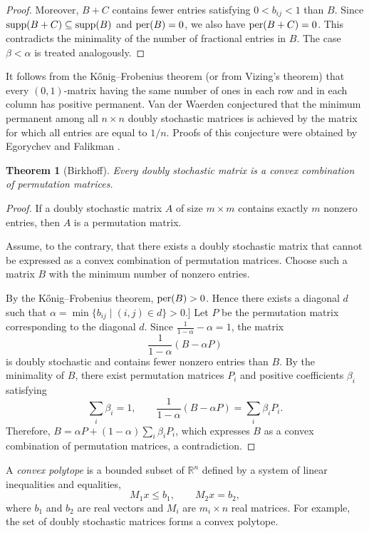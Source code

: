 \documentclass[11pt]{article}
\newtheorem{theorem}{Theorem}[section]
\theoremstyle{definition}
\newcommand{\supp}{{\rm supp}}
\newcommand{\per}{{\rm per}}
\begin{document}
{{{\begin{proof}
Moreover, $B+C$ contains fewer entries satisfying
$0<b_{ij}<1$
than $B$.
Since $\supp(B+C)\subseteq \supp(B)$ and
$\per(B)=0$,
we also have
$\per(B+C)=0$.
This contradicts the minimality of the number of fractional entries in
$B$.
The case
$\beta<\alpha$
is treated analogously.
\end{proof}

It follows from the Kőnig--Frobenius theorem (or from Vizing's theorem) that every $(0,1)$-matrix
having the same number of ones in each row and in each column has
positive permanent.  Van der Waerden conjectured that the minimum permanent among all $n \times n$ doubly stochastic matrices is  achieved by the matrix for which all entries are equal to $1/n$. Proofs of this conjecture were obtained  by Egorychev \cite{Egor} and Falikman \cite{Falik}.

\begin{theorem}[Birkhoff]
Every doubly stochastic matrix is a convex combination of permutation
matrices.
\end{theorem}

\begin{proof}
If a doubly stochastic matrix $A$ of size $m\times m$ contains exactly
$m$ nonzero entries, then $A$ is a permutation matrix.

Assume, to the contrary, that there exists a doubly stochastic matrix
that cannot be expressed as a convex combination of permutation
matrices.
Choose such a matrix $B$ with the minimum number of nonzero entries.

By the Kőnig--Frobenius theorem,
$\per(B)>0$.
Hence there exists a diagonal $d$ such that
$\alpha=\min\{b_{ij}\mid(i,j)\in d\}>0$.]
Let $P$ be the permutation matrix corresponding to the diagonal $d$.
Since $\frac{1}{1-\alpha}-\alpha=1$,  the matrix
\[
\frac{1}{1-\alpha}(B-\alpha P)
\]
is doubly stochastic and contains fewer nonzero entries than $B$.
By the minimality of $B$, there exist permutation matrices
$P_i$ and positive coefficients $\beta_i$ satisfying
\[
\sum_i\beta_i=1,
\qquad
\frac{1}{1-\alpha}(B-\alpha P)
=
\sum_i\beta_iP_i.
\]
Therefore,
$B=\alpha P+(1-\alpha)\sum_i\beta_iP_i$,
which expresses $B$ as a convex combination of permutation matrices, a
contradiction.
\end{proof}



A {\sl convex polytope} is a bounded subset of $\mathbb{R}^n$
defined by a system of linear inequalities and equalities,
\[
M_1x\le b_1,\qquad M_2x=b_2,
\]
where $b_1$ and $b_2$ are real vectors and $M_i$ are
$m_i\times n$ real matrices.
For example, the set of doubly stochastic matrices forms a convex
polytope.

}}}
\end{document}
